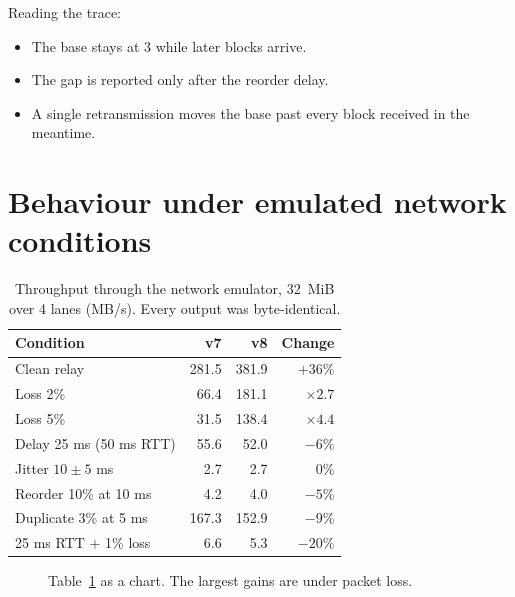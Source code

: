 \noindent Reading the trace:
\begin{itemize}
  \item The base stays at 3 while later blocks arrive.
  \item The gap is reported only after the reorder delay.
  \item A single retransmission moves the base past every block received in the meantime.
\end{itemize}

\section{Behaviour under emulated network conditions}

\begin{table}[H]
\centering\small
\caption{Throughput through the network emulator, 32~MiB over 4 lanes (MB/s). Every output was byte-identical.}\label{tab:netem}
\begin{tabular}{lrrr}
\toprule
\textbf{Condition} & \textbf{v7} & \textbf{v8} & \textbf{Change} \\
\midrule
Clean relay & 281.5 & 381.9 & $+36\%$ \\
Loss 2\% & 66.4 & 181.1 & $\times 2.7$ \\
Loss 5\% & 31.5 & 138.4 & $\times 4.4$ \\
Delay 25 ms (50 ms RTT) & 55.6 & 52.0 & $-6\%$ \\
Jitter $10\pm5$ ms & 2.7 & 2.7 & $0\%$ \\
Reorder 10\% at 10 ms & 4.2 & 4.0 & $-5\%$ \\
Duplicate 3\% at 5 ms & 167.3 & 152.9 & $-9\%$ \\
25 ms RTT $+$ 1\% loss & 6.6 & 5.3 & $-20\%$ \\
\bottomrule
\end{tabular}
\end{table}

\begin{figure}[H]
\centering
{}
\caption{Table~\ref{tab:netem} as a chart. The largest gains are under packet loss.}\label{fig:netem}
\end{figure}

